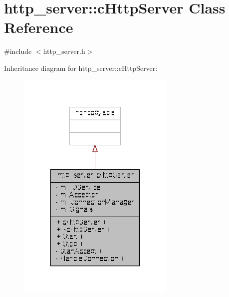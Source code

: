 \hypertarget{classhttp__server_1_1cHttpServer}{\section{http\-\_\-server\-:\-:c\-Http\-Server Class Reference}
\label{classhttp__server_1_1cHttpServer}
}


{\ttfamily \#include $<$http\-\_\-server.\-h$>$}



Inheritance diagram for http\-\_\-server\-:\-:c\-Http\-Server\-:
\nopagebreak
\begin{figure}[H]
\begin{center}
\leavevmode
\includegraphics[width=214pt]{classhttp__server_1_1cHttpServer__inherit__graph}
\end{center}
\end{figure}


